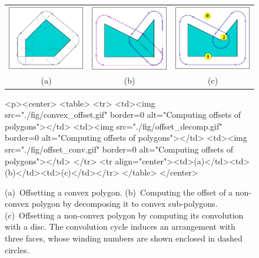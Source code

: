 \begin{figure}[t]
\begin{ccTexOnly}
\begin{center}
  \begin{tabular}{ccc}
    \includegraphics{Minkowski_sum_2/fig/convex_offset} &
    \includegraphics{Minkowski_sum_2/fig/offset_decomp} &
    \includegraphics{Minkowski_sum_2/fig/offset_conv} \\
    {\small (a)} & {\small (b)} & {\small (c)}
  \end{tabular}
\end{center}
\end{ccTexOnly}
\begin{ccHtmlOnly}
  <p><center>
  <table>
  <tr>
  <td><img src="./fig/convex_offset.gif" border=0 alt="Computing offsets of polygons"></td>
  <td><img src="./fig/offset_decomp.gif" border=0 alt="Computing offsets of polygons"></td>
  <td><img src="./fig/offset_conv.gif" border=0 alt="Computing offsets of polygons"></td>
  </tr>
  <tr align="center"><td>(a)</td><td>(b)</td><td>(c)</td></tr>
  </table>
  </center>
\end{ccHtmlOnly}
\caption{(a)~Offsetting a convex polygon.
(b)~Computing the offset of a non-convex polygon by decomposing
it to convex sub-polygons. (c)~Offsetting a non-convex polygon
by computing its convolution with a disc. The convolution cycle
induces an arrangement with three faces, whose winding numbers
are shown enclosed in dashed circles.}
\label{mink_fig:pgn_offset}
\end{figure}

